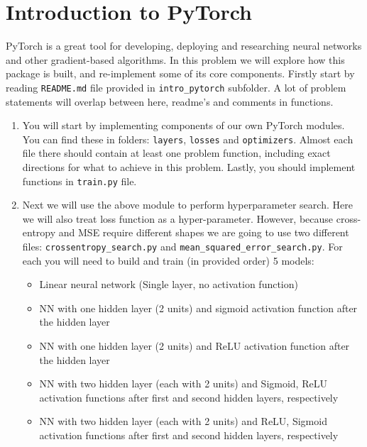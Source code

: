 \documentclass{article}
\begin{document}
\section*{Introduction to PyTorch}
\begin{aprob}
    \label{code-pytorch}
    PyTorch is a great tool for developing, deploying and researching neural networks and other gradient-based algorithms.
    In this problem we will explore how this package is built, and re-implement some of its core components.
    Firstly start by reading \texttt{README.md} file provided in \texttt{intro\_pytorch} subfolder.
    A lot of problem statements will overlap between here, readme's and comments in functions.
    
    \begin{enumerate}
        \item {} You will start by implementing components of our own PyTorch modules. You can find these in folders: \texttt{layers}, \texttt{losses} and \texttt{optimizers}. Almost each file there should contain at least one problem function, including exact directions for what to achieve in this problem. Lastly, you should implement functions in \texttt{train.py} file.
        \item {} Next we will use the above module to perform hyperparameter search. Here we will also treat loss function as a hyper-parameter. However, because cross-entropy and MSE require different shapes we are going to use two different files: \texttt{crossentropy\_search.py} and \texttt{mean\_squared\_error\_search.py}.
        For each you will need to build and train (in provided order) 5 models:
        \begin{itemize}
            \item Linear neural network (Single layer, no activation function)
            \item NN with one hidden layer (2 units) and sigmoid activation function after the hidden layer
            \item NN with one hidden layer (2 units) and ReLU activation function after the hidden layer
            \item NN with two hidden layer (each with 2 units) and Sigmoid, ReLU activation functions after first and second hidden layers, respectively
            \item NN with two hidden layer (each with 2 units) and ReLU, Sigmoid activation functions after first and second hidden layers, respectively

\end{itemize}
\end{enumerate}
\end{aprob}
\end{document}
